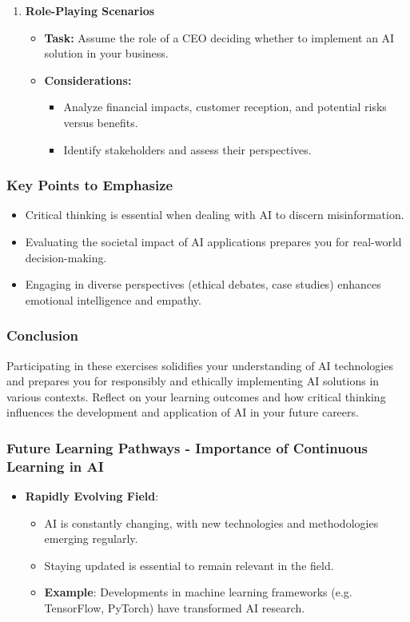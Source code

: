 \documentclass[aspectratio=169]{beamer}
\begin{document}
\begin{frame}[fragile]
\begin{enumerate}
        \item \textbf{Role-Playing Scenarios}
        \begin{itemize}
            \item \textbf{Task:} Assume the role of a CEO deciding whether to implement an AI solution in your business.
            \item \textbf{Considerations:}
            \begin{itemize}
                \item Analyze financial impacts, customer reception, and potential risks versus benefits.
                \item Identify stakeholders and assess their perspectives.
            \end{itemize}
        \end{itemize}
    \end{enumerate}
\end{frame}

\begin{frame}[fragile]
    \frametitle{Key Points to Emphasize}
    \begin{itemize}
        \item Critical thinking is essential when dealing with AI to discern misinformation.
        \item Evaluating the societal impact of AI applications prepares you for real-world decision-making.
        \item Engaging in diverse perspectives (ethical debates, case studies) enhances emotional intelligence and empathy.
    \end{itemize}
\end{frame}

\begin{frame}[fragile]
    \frametitle{Conclusion}
    Participating in these exercises solidifies your understanding of AI technologies and prepares you for responsibly and ethically implementing AI solutions in various contexts. Reflect on your learning outcomes and how critical thinking influences the development and application of AI in your future careers.
\end{frame}

\begin{frame}[fragile]
    \frametitle{Future Learning Pathways - Importance of Continuous Learning in AI}
    \begin{itemize}
        \item \textbf{Rapidly Evolving Field}:
            \begin{itemize}
                \item AI is constantly changing, with new technologies and methodologies emerging regularly.
                \item Staying updated is essential to remain relevant in the field.
                \item \textbf{Example}: Developments in machine learning frameworks (e.g. TensorFlow, PyTorch) have transformed AI research.
            \end{itemize}
    \end{itemize}
\end{frame}
\end{document}
